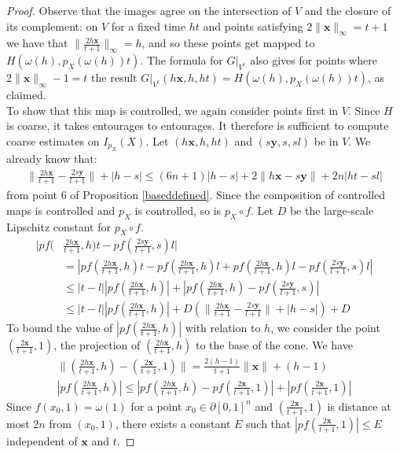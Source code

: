 \documentclass[a4paper,11pt]{article}
\theoremstyle{definition}
\theoremstyle{plain}
\theoremstyle{remark}
\begin{document}
\begin{proof}
Observe that the images agree on the intersection of $V$ and the closure of its complement: on $V$ for a fixed time $ht$ and points satisfying $2\|\mathbf{x}\|_{\infty} = t+1$ we have that $\|\frac{2h\mathbf{x}}{t+1}\|_{\infty} = h$, and so these points get mapped to $H(\omega(h), p_{X}(\omega(h))t)$. The formula for $G|_{V^c}$ also gives for points where $2\|\mathbf{x}\|_{\infty}-1= t$ the result $G|_{V^c}(h\mathbf{x}, h,ht) = H(\omega(h), p_{X}(\omega(h))t)$, as claimed.\\

To show that this map is controlled, we again consider points first in $V$. Since $H$ is coarse, it takes entourages to entourages. It therefore is sufficient to compute coarse estimates on $I_{p_{X}}(X)$.  Let $(h\mathbf{x},h,ht)$ and $(s\mathbf{y}, s,sl)$ be in $V$. We already know that:
\begin{align*}
\|\frac{2h\mathbf{x}}{t+1}-\frac{2s\mathbf{y}}{l+1}\| + |h-s| \leq (6n+1)|h-s|+2\|h\mathbf{x}-s \mathbf{y}\|+2n |ht-sl|
\end{align*}
from point $6$ of Proposition \ref{baseddefined}. Since the composition of controlled maps is controlled and $p_{X}$ is controlled, so is $p_{X}\circ f$. Let $D$ be the large-scale Lipschitz constant for $p_{X}\circ f$.
\begin{align*}
|pf(&\frac{2h\mathbf{x}}{t+1},h)t-pf(\frac{2s\mathbf{y}}{l+1},s)l| \\
&=|pf(\frac{2h\mathbf{x}}{t+1},h)t-pf(\frac{2h\mathbf{x}}{t+1},h)l+pf(\frac{2h\mathbf{x}}{t+1},h)l-pf(\frac{2s\mathbf{y}}{l+1},s)l| \\
&\leq |t-l||pf(\frac{2h\mathbf{x}}{t+1},h)| +|pf(\frac{2h \mathbf{x}}{t+1},h)-pf(\frac{2s\mathbf{y}}{l+1},s)|\\
&\leq  |t-l||pf(\frac{2h\mathbf{x}}{t+1},h)| +  D(\|\frac{2h\mathbf{x}}{t+1}-\frac{2s\mathbf{y}}{l+1}\| + |h-s|) +D
\end{align*}
To bound the value of $|pf(\frac{2h\mathbf{x}}{t+1},h)|$ with relation to $h$, we consider the point $(\frac{2\mathbf{x}}{t+1},1)$, the projection of $(\frac{2h\mathbf{x}}{t+1},h)$ to the base of the cone. We have
\begin{align*}
\|(\frac{2h\mathbf{x}}{t+1},h)-(\frac{2\mathbf{x}}{t+1},1)\| = \frac{2(h-1)}{t+1} \|\mathbf{x}\| + (h-1)\\
|pf(\frac{2h\mathbf{x}}{t+1},h)| \leq |pf(\frac{2h\mathbf{x}}{t+1},h)-pf(\frac{2\mathbf{x}}{t+1},1)| + |pf(\frac{2\mathbf{x}}{t+1},1)|
\end{align*}
Since $f(x_0,1) = \omega(1)$ for a point $x_0\in \partial [0,1]^n$ and $(\frac{2\mathbf{x}}{t+1},1)$ is distance at most $2n$ from $(x_0,1)$, there exists a constant $E$ such that $|pf(\frac{2\mathbf{x}}{t+1},1)|\leq E$ independent of $\mathbf{x}$ and $t$.

\end{proof}
\end{document}
